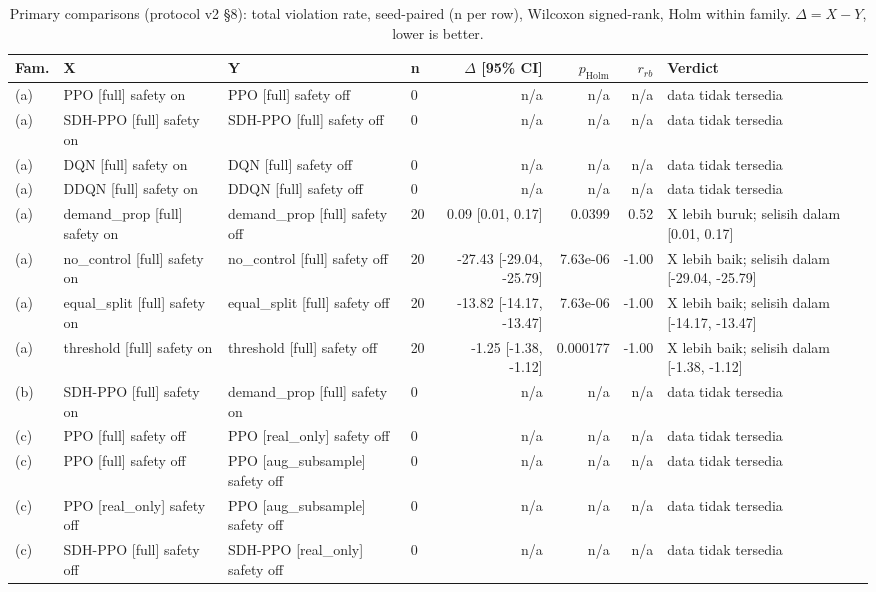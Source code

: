 \begin{table}[t]
\centering
\footnotesize
\caption{Primary comparisons (protocol v2 \S8): total violation rate, seed-paired (n per row), Wilcoxon signed-rank, Holm within family. $\Delta = X - Y$, lower is better.}
\label{tab:primary_v2}
\begin{tabular}{llllrrrl}
\toprule
Fam. & X & Y & n & $\Delta$ [95\% CI] & $p_{\mathrm{Holm}}$ & $r_{rb}$ & Verdict \\
\midrule
(a) & PPO [full] safety on & PPO [full] safety off & 0 & n/a & n/a & n/a & data tidak tersedia \\
(a) & SDH-PPO [full] safety on & SDH-PPO [full] safety off & 0 & n/a & n/a & n/a & data tidak tersedia \\
(a) & DQN [full] safety on & DQN [full] safety off & 0 & n/a & n/a & n/a & data tidak tersedia \\
(a) & DDQN [full] safety on & DDQN [full] safety off & 0 & n/a & n/a & n/a & data tidak tersedia \\
(a) & demand\_prop [full] safety on & demand\_prop [full] safety off & 20 & 0.09 [0.01, 0.17] & 0.0399 & 0.52 & X lebih buruk; selisih dalam [0.01, 0.17] \\
(a) & no\_control [full] safety on & no\_control [full] safety off & 20 & -27.43 [-29.04, -25.79] & 7.63e-06 & -1.00 & X lebih baik; selisih dalam [-29.04, -25.79] \\
(a) & equal\_split [full] safety on & equal\_split [full] safety off & 20 & -13.82 [-14.17, -13.47] & 7.63e-06 & -1.00 & X lebih baik; selisih dalam [-14.17, -13.47] \\
(a) & threshold [full] safety on & threshold [full] safety off & 20 & -1.25 [-1.38, -1.12] & 0.000177 & -1.00 & X lebih baik; selisih dalam [-1.38, -1.12] \\
(b) & SDH-PPO [full] safety on & demand\_prop [full] safety on & 0 & n/a & n/a & n/a & data tidak tersedia \\
(c) & PPO [full] safety off & PPO [real\_only] safety off & 0 & n/a & n/a & n/a & data tidak tersedia \\
(c) & PPO [full] safety off & PPO [aug\_subsample] safety off & 0 & n/a & n/a & n/a & data tidak tersedia \\
(c) & PPO [real\_only] safety off & PPO [aug\_subsample] safety off & 0 & n/a & n/a & n/a & data tidak tersedia \\
(c) & SDH-PPO [full] safety off & SDH-PPO [real\_only] safety off & 0 & n/a & n/a & n/a & data tidak tersedia \\

\end{tabular}
\end{table}
